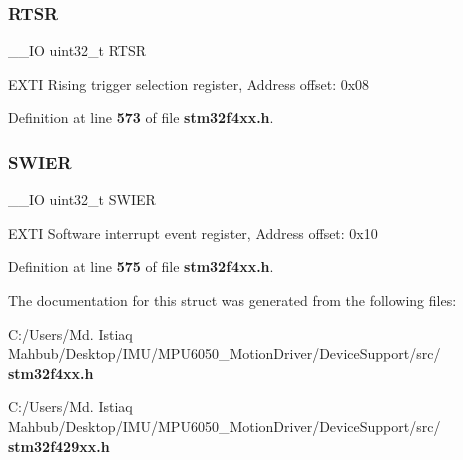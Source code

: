 \subsubsection{R\+T\+SR}
{\footnotesize\ttfamily \+\_\+\+\_\+\+IO uint32\+\_\+t R\+T\+SR}

E\+X\+TI Rising trigger selection register, Address offset\+: 0x08 

Definition at line \textbf{ 573} of file \textbf{ stm32f4xx.\+h}.

\mbox{\label{structEXTI__TypeDef_a9eae93b6cc13d4d25e12f2224e2369c9}} 
\subsubsection{S\+W\+I\+ER}
{\footnotesize\ttfamily \+\_\+\+\_\+\+IO uint32\+\_\+t S\+W\+I\+ER}

E\+X\+TI Software interrupt event register, Address offset\+: 0x10 

Definition at line \textbf{ 575} of file \textbf{ stm32f4xx.\+h}.



The documentation for this struct was generated from the following files\+:\begin{DoxyCompactItemize}
\item 
C\+:/\+Users/\+Md. Istiaq Mahbub/\+Desktop/\+I\+M\+U/\+M\+P\+U6050\+\_\+\+Motion\+Driver/\+Device\+Support/src/\textbf{ stm32f4xx.\+h}\item 
C\+:/\+Users/\+Md. Istiaq Mahbub/\+Desktop/\+I\+M\+U/\+M\+P\+U6050\+\_\+\+Motion\+Driver/\+Device\+Support/src/\textbf{ stm32f429xx.\+h}\end{DoxyCompactItemize}
